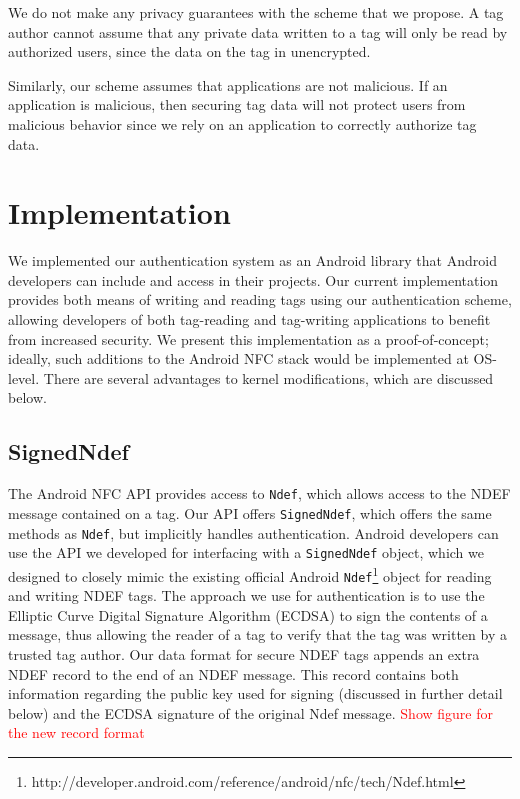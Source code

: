 \documentclass[12pt]{article}
\newcommand\TODO[1]{\textcolor{red}{#1}}
\begin{document}
We do not make any privacy guarantees with the scheme that we propose.
A tag author cannot assume that any private data written to a tag will only be read by authorized users, since the data on the tag in unencrypted.

Similarly, our scheme assumes that applications are not malicious.
If an application is malicious, then securing tag data will not protect users from malicious behavior since we rely on an application to correctly authorize tag data.

\section{Implementation}
We implemented our authentication system as an Android library that Android developers can include and access in their projects.
Our current implementation provides both means of writing and reading tags using our authentication scheme, allowing developers of both tag-reading and tag-writing applications to benefit from increased security.
We present this implementation as a proof-of-concept; ideally, such additions to the Android NFC stack would be implemented at OS-level.
There are several advantages to kernel modifications, which are discussed below.

\subsection{SignedNdef}
The Android NFC API provides access to \texttt{Ndef}, which allows access to the NDEF message contained on a tag.
Our API offers \texttt{SignedNdef}, which offers the same methods as \texttt{Ndef}, but implicitly handles authentication.
Android developers can use the API we developed for interfacing with a \texttt{SignedNdef} object, which we designed to closely mimic the existing official Android \texttt{Ndef}\footnote{http://developer.android.com/reference/android/nfc/tech/Ndef.html} object for reading and writing NDEF tags.
The approach we use for authentication is to use the Elliptic Curve Digital Signature Algorithm (ECDSA) to sign the contents of a message, thus allowing the reader of a tag to verify that the tag was written by a trusted tag author.
Our data format for secure NDEF tags appends an extra NDEF record to the end of an NDEF message.
This record contains both information regarding the public key used for signing (discussed in further detail below) and the ECDSA signature of the original Ndef message.
\TODO{Show figure for the new record format}
\end{document}
